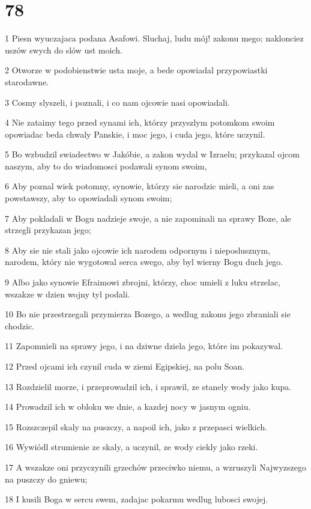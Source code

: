 \chapter{78}

\par 1 Piesn wyuczajaca podana Asafowi. Sluchaj, ludu mój! zakonu mego; naklonciez uszów swych do slów ust moich.
\par 2 Otworze w podobienstwie usta moje, a bede opowiadal przypowiastki starodawne.
\par 3 Cosmy slyszeli, i poznali, i co nam ojcowie nasi opowiadali.
\par 4 Nie zataimy tego przed synami ich, którzy przyszlym potomkom swoim opowiadac beda chwaly Panskie, i moc jego, i cuda jego, które uczynil.
\par 5 Bo wzbudzil swiadectwo w Jakóbie, a zakon wydal w Izraelu; przykazal ojcom naszym, aby to do wiadomosci podawali synom swoim,
\par 6 Aby poznal wiek potomny, synowie, którzy sie narodzic mieli, a oni zas powstawszy, aby to opowiadali synom swoim;
\par 7 Aby pokladali w Bogu nadzieje swoje, a nie zapominali na sprawy Boze, ale strzegli przykazan jego;
\par 8 Aby sie nie stali jako ojcowie ich narodem odpornym i nieposlusznym, narodem, który nie wygotowal serca swego, aby byl wierny Bogu duch jego.
\par 9 Albo jako synowie Efraimowi zbrojni, którzy, choc umieli z luku strzelac, wszakze w dzien wojny tyl podali.
\par 10 Bo nie przestrzegali przymierza Bozego, a wedlug zakonu jego zbraniali sie chodzic.
\par 11 Zapomnieli na sprawy jego, i na dziwne dziela jego, które im pokazywal.
\par 12 Przed ojcami ich czynil cuda w ziemi Egipskiej, na polu Soan.
\par 13 Rozdzielil morze, i przeprowadzil ich, i sprawil, ze stanely wody jako kupa.
\par 14 Prowadzil ich w obloku we dnie, a kazdej nocy w jasnym ogniu.
\par 15 Rozszczepil skaly na puszczy, a napoil ich, jako z przepasci wielkich.
\par 16 Wywiódl strumienie ze skaly, a uczynil, ze wody ciekly jako rzeki.
\par 17 A wszakze oni przyczynili grzechów przeciwko niemu, a wzruszyli Najwyzszego na puszczy do gniewu;
\par 18 I kusili Boga w sercu swem, zadajac pokarmu wedlug lubosci swojej.
